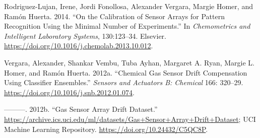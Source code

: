 \documentclass[
  letterpaper,
  DIV=11,
  numbers=noendperiod]{scrartcl}
\newlength{\cslhangindent}
\newenvironment{CSLReferences}[2] %
 {\begin{list}{}{%
  \setlength{\itemindent}{0pt}
  \setlength{\leftmargin}{0pt}
  \setlength{\parsep}{0pt}
  \ifodd #1
   \setlength{\leftmargin}{\cslhangindent}
   \setlength{\itemindent}{-1\cslhangindent}
  \fi
  \setlength{\itemsep}{#2\baselineskip}}}
 {\end{list}}
\begin{document}
\label{refs}
\begin{CSLReferences}{1}{0}
Rodriguez-Lujan, Irene, Jordi Fonollosa, Alexander Vergara, Margie
Homer, and Ramón Huerta. 2014. {``On the Calibration of Sensor Arrays
for Pattern Recognition Using the Minimal Number of Experiments.''} In
\emph{Chemometrics and Intelligent Laboratory Systems}, 130:123--34.
Elsevier. \url{https://doi.org/10.1016/j.chemolab.2013.10.012}.

Vergara, Alexander, Shankar Vembu, Tuba Ayhan, Margaret A. Ryan, Margie
L. Homer, and Ramón Huerta. 2012a. {``Chemical Gas Sensor Drift
Compensation Using Classifier Ensembles.''} \emph{Sensors and Actuators
B: Chemical} 166: 320--29.
\url{https://doi.org/10.1016/j.snb.2012.01.074}.

---------. 2012b. {``Gas Sensor Array Drift Dataset.''}
\url{https://archive.ics.uci.edu/ml/datasets/Gas+Sensor+Array+Drift+Dataset};
UCI Machine Learning Repository. \url{https://doi.org/10.24432/C5QC8P}.

\end{CSLReferences}
\end{document}
